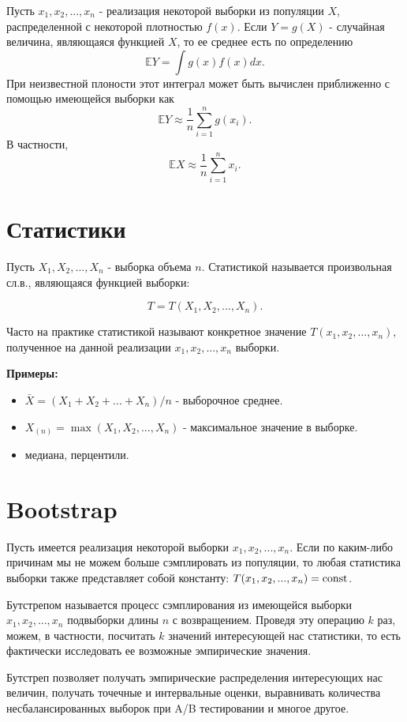 Пусть $x_1, x_2, ..., x_n$ - реализация некоторой выборки из популяции $X$, распределенной с некоторой плотностью $f(x)$. Если $Y = g(X)$ - случайная величина, являющаяся функцией $X$, то ее среднее есть по определению
$$
\mathbb{E}Y = \int g(x)f(x)dx.
$$
При неизвестной плоности этот интеграл может быть вычислен приближенно с помощью имеющейся выборки как
$$
\mathbb{E}Y \approx \frac{1}{n}\sum_{i=1}^ng(x_i).
$$
В частности,
$$
\mathbb{E}X \approx \frac{1}{n}\sum_{i=1}^nx_i.
$$


\section{Статистики}

Пусть $X_1, X_2, ..., X_n$ - выборка объема $n$. Статистикой называется произвольная сл.в., являющаяся функцией выборки:

$$
T = T(X_1, X_2, ..., X_n).
$$

Часто на практике статистикой называют конкретное значение $T(x_1, x_2, ..., x_n)$, полученное на данной реализации $x_1, x_2, ..., x_n$ выборки.

\textbf{Примеры:}
\begin{itemize}
    \item $\bar{X} = (X_1 + X_2 + ... + X_n)/n$ - выборочное среднее.
    \item $X_{(n)} = \max(X_1, X_2, ..., X_n)$ - максимальное значение в выборке.
    \item медиана, перцентили.
\end{itemize}


\section{Bootstrap}

Пусть имеется реализация некоторой выборки $x_1, x_2, ..., x_n$. Если по каким-либо причинам мы не можем больше сэмплировать из популяции, то любая статистика выборки также представляет собой константу: $T(x_1, x_2, ..., x_n) = \operatorname*{const}$. 

Бутстрепом называется процесс сэмплирования из имеющейся выборки $x_1, x_2, ..., x_n$ подвыборки длины $n$ с возвращением. Проведя эту операцию $k$ раз, можем, в частности, посчитать $k$ значений интересующей нас статистики, то есть фактически исследовать ее возможные эмпирические значения.

Бутстреп позволяет получать эмпирические распределения интересующих нас величин, получать точечные и интервальные оценки, выравнивать количества несбалансированных выборок при A/B тестировании и многое другое.

